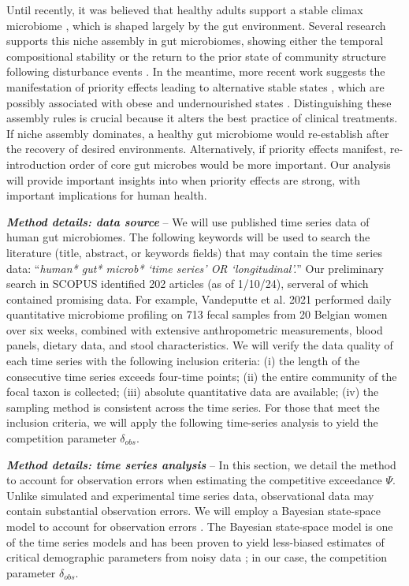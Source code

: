 \documentclass[12pt, class=article, crop=false]{standalone}
\begin{document}
Until recently, it was believed that healthy adults support a stable climax microbiome \citep{hooper_how_2002, fierer_animalcules_2012}, which is shaped largely by the gut environment.
Several research supports this niche assembly in gut microbiomes, showing either the temporal compositional stability \citep{costello_bacterial_2009} or the return to the prior state of community structure following disturbance events \citep{dethlefsen_incomplete_2011, young_antibiotic-associated_2004, dethlefsen_pervasive_2008, david_host_2014}.
In the meantime, more recent work suggests the manifestation of priority effects leading to alternative stable states \citep{dominguez-bello_delivery_2010, sprockett_role_2018, ojima_priority_2022}, which are possibly associated with obese and undernourished states \citep{fierer_animalcules_2012}.
Distinguishing these assembly rules is crucial because it alters the best practice of clinical treatments.
If niche assembly dominates, a healthy gut microbiome would re-establish after the recovery of desired environments.
Alternatively, if priority effects manifest, re-introduction order of core gut microbes would be more important.
Our analysis will provide important insights into when priority effects are strong, with important implications for human health.

\textit{\textbf{Method details: data source}} --
We will use published time series data of human gut microbiomes.
The following keywords will be used to search the literature (title, abstract, or keywords fields) that may contain the time series data: ``\textit{human* gut* microb* `time series' OR `longitudinal'.}''
Our preliminary search in SCOPUS identified 202 articles (as of 1/10/24), serveral of which contained promising data.
For example, Vandeputte et al. 2021 \citep{vandeputte_temporal_2021} performed daily quantitative microbiome profiling on 713 fecal samples from 20 Belgian women over six weeks, combined with extensive anthropometric measurements, blood panels, dietary data, and stool characteristics. 
We will verify the data quality of each time series with the following inclusion criteria: (i) the length of the consecutive time series exceeds four-time points; (ii) the entire community of the focal taxon is collected; (iii) absolute quantitative data are available; (iv) the sampling method is consistent across the time series.
For those that meet the inclusion criteria, we will apply the following time-series analysis to yield the competition parameter $\delta_{obs}$.

\textit{\textbf{Method details: time series analysis}} --
In this section, we detail the method to account for observation errors when estimating the competitive exceedance $\Psi$.
Unlike simulated and experimental time series data, observational data may contain substantial observation errors.
We will employ a Bayesian state-space model to account for observation errors \citep{kery_bayesian_2012, amano_hierarchical_2012, anderson_black-swan_2017, terui_metapopulation_2018, terui_intentional_2023}.
The Bayesian state-space model is one of the time series models and has been proven to yield less-biased estimates of critical demographic parameters from noisy data \citep{kery_bayesian_2012}; in our case, the competition parameter $\delta_{obs}$.
\end{document}
